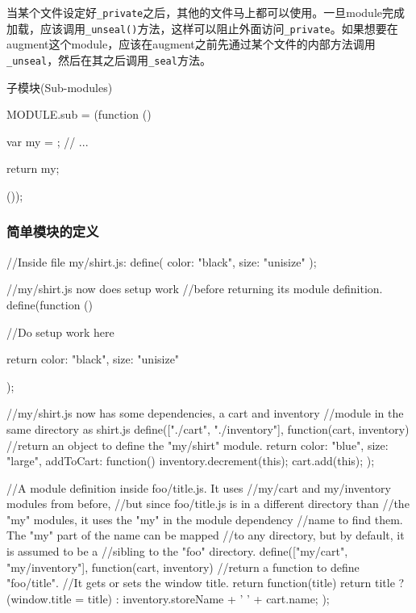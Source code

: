 当某个文件设定好\lstinline$_private$之后，其他的文件马上都可以使用。一旦module完成加载，应该调用\lstinline$_unseal()$方法，这样可以阻止外面访问\lstinline$_private$。如果想要在augment这个module，应该在augment之前先通过某个文件的内部方法调用\lstinline$_unseal$，然后在其之后调用\lstinline$_seal$方法。	


子模块(Sub-modules)

\begin{JavaScript}
MODULE.sub = (function () {
	var my = {};
	// ...

	return my;
}());
\end{JavaScript}

\subsubsection{简单模块的定义}

\begin{JavaScript}
//Inside file my/shirt.js:
define({
    color: "black",
    size: "unisize"
});
\end{JavaScript}

\begin{JavaScript}
//my/shirt.js now does setup work
//before returning its module definition.
define(function () {
    //Do setup work here

    return {
        color: "black",
        size: "unisize"
    }
});
\end{JavaScript}

\begin{JavaScript}
//my/shirt.js now has some dependencies, a cart and inventory
//module in the same directory as shirt.js
define(["./cart", "./inventory"], function(cart, inventory) {
        //return an object to define the "my/shirt" module.
        return {
            color: "blue",
            size: "large",
            addToCart: function() {
                inventory.decrement(this);
                cart.add(this);
            }
        }
    }
);
\end{JavaScript}

\begin{JavaScript}[任何有效的函数返回值都可以返回]
//A module definition inside foo/title.js. It uses
//my/cart and my/inventory modules from before,
//but since foo/title.js is in a different directory than
//the "my" modules, it uses the "my" in the module dependency
//name to find them. The "my" part of the name can be mapped
//to any directory, but by default, it is assumed to be a
//sibling to the "foo" directory.
define(["my/cart", "my/inventory"],
    function(cart, inventory) {
        //return a function to define "foo/title".
        //It gets or sets the window title.
        return function(title) {
            return title ? (window.title = title) :
                   inventory.storeName + ' ' + cart.name;
        }
    }
);
\end{JavaScript}


